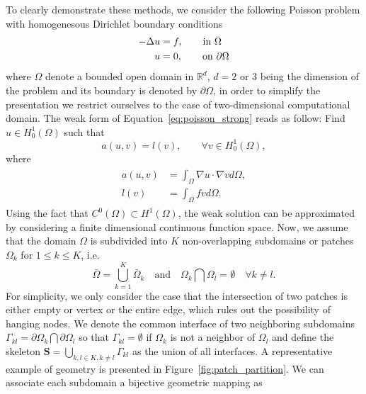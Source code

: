 \documentclass[preprint,12pt]{elsarticle}
\begin{document}
To clearly demonstrate these methods, we consider the following Poisson problem with homogenesous Dirichlet boundary conditions
\begin{align}
    \begin{split}
        -\Delta{u}&=f, \qquad \textnormal{in $\Omega$}\\
        u&=0, \qquad \textnormal{on $\partial\Omega$}
    \end{split}\label{eq:poisson_strong}
\end{align}
where $\Omega$ denote a bounded open domain in $\mathbb{R}^d$, $d=2$ or $3$ being the dimension of the problem and its boundary is denoted by $\partial{\Omega}$, in order to simplify the presentation we restrict ourselves to the case of two-dimensional computational domain. The weak form of Equation~\eqref{eq:poisson_strong} reads as follow: Find $u\in{H^1_0(\Omega)}$ such that
\begin{equation}
    a(u,v)=l(v), \qquad \forall v\in{H^1_0(\Omega)},\label{eq:poisson_weak}
\end{equation}
where 
\begin{align}
    \begin{split}
        a(u,v)&=\int_{\Omega}\nabla{u}\cdot\nabla{v}d\Omega,\\
        l(v)&=\int_{\Omega}fvd\Omega.
    \end{split}
\end{align}
Using the fact that $C^0(\Omega)\subset{}H^1(\Omega)$, the weak solution can be approximated by considering a finite dimensional continuous function space. Now, we assume that the domain $\Omega$ is subdivided into $K$ non-overlapping subdomains or patches $\Omega_k$ for $1\leq{k}\leq{K}$, i.e.\ 
\begin{equation}
\bar{\Omega} = \bigcup_{k=1}^{K} \bar{\Omega}_{k}  \quad \textrm{and} \quad {\Omega}_{k}\bigcap{\Omega}_{l}=\emptyset \quad \forall k\neq{l}.
\end{equation}
For simplicity, we only consider the case that the intersection of two patches is either empty or vertex or the entire edge, which rules out the possibility of hanging nodes. We denote the common interface of two neighboring subdomains $\Gamma_{kl}=\partial{\Omega}_k\bigcap\partial{\Omega}_l$ so that $\Gamma_{kl}=\emptyset$ if $\Omega_k$ is not a neighbor of $\Omega_l$ and define the skeleton $\mathbf{S}=\bigcup_{k,l\in{K}, k\neq{l}}\Gamma_{kl}$ as the union of all interfaces. A representative example of geometry is presented in Figure~\ref{fig:patch_partition}. We can associate each subdomain a bijective geometric mapping as
\end{document}
